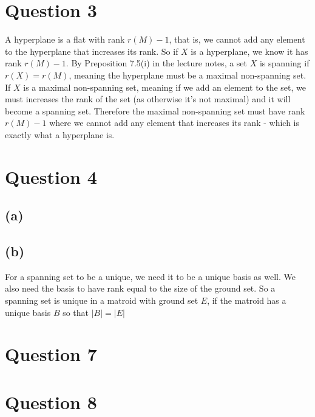 \documentclass[a4paper, fleqn]{article}
\begin{document}
\section*{Question 3}
A hyperplane is a flat with rank $r(M)-1$, that is, we cannot add any element to the
hyperplane that increases its rank. So if $X$ is a hyperplane, we know it has rank
$r(M)-1$. By Preposition 7.5(i) in the lecture notes, a set $X$ is spanning if
$r(X)=r(M)$, meaning the hyperplane must be a maximal non-spanning set. \\
If $X$ is a maximal non-spanning set, meaning if we add an element to the set, we must
increases the rank of the set (as otherwise it's not maximal) and it will become a
spanning set. Therefore the maximal non-spanning set must have rank $r(M)-1$ where we
cannot add any element that increases its rank - which is exactly what a hyperplane is.

\section*{Question 4}
\subsection*{(a)}

\subsection*{(b)}
For a spanning set to be a unique, we need it to be a unique basis as well. We also need
the basis to have rank equal to the size of the ground set. So a spanning set is unique
in a matroid with ground set $E$, if the matroid has a unique basis $B$ so that $|B|=|E|$

\section*{Question 7}

\section*{Question 8}
\end{document}
